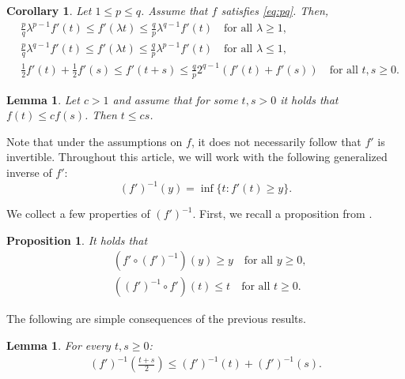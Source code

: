 \documentclass[11pt]{amsart}
\theoremstyle{plain}
\newtheorem{lemma}[theorem]{Lemma}
\newtheorem{corollary}[theorem]{Corollary}
\newtheorem{proposition}[theorem]{Proposition}
\theoremstyle{definition}
\numberwithin{equation}{section}
\begin{document}
\begin{corollary}\cite[Corollary 2.4]{ChKiWe21}
Let $1 \leq p \leq q$. Assume that $f$ satisfies \eqref{eq:pq}. Then,
\begin{align}
\label{eq:derivativedoubling1}
&\frac{p}{q} \lambda^{p-1} f'(t) \leq f'(\lambda t) \leq \frac{q}{p}\lambda^{q-1} f'(t) \quad\text{for all } \lambda \geq 1, \\
\label{eq:derivativedoubling2}
&\frac{p}{q} \lambda^{q-1} f'(t) \leq f'(\lambda t) \leq \frac{q}{p}\lambda^{p-1} f'(t) \quad\text{for all } \lambda \leq 1, \\
\label{eq:der-subadd}
&\frac{1}{2}f'(t) + \frac{1}{2}f'(s) \le f'(t + s) \leq \frac{q}{p} 2^{q-1}(f'(t) + f'(s)) \quad\text{for all } t,s \geq 0.
\end{align}
\end{corollary}

\begin{lemma}\cite[Lemma 2.5]{ChKiWe21}
\label{lem:g-inv}
Let $c > 1$ and assume that for some $t,s > 0$ it holds that $f(t) \le c f(s)$. Then $t \le cs$.
\end{lemma}

Note that under the assumptions on $f$, it does not necessarily follow that $f'$ is invertible. Throughout this article, we will work with the following generalized inverse of $f'$: 
\begin{equation}\label{eq:geninverse}
(f')^{-1}(y) = \inf \lbrace t: f'(t) \geq y \rbrace.
\end{equation}

We collect a few properties of $(f')^{-1}$. First, we recall a proposition from \cite{ChKiWe21}.

\begin{proposition}\cite[Proposition 3.1]{ChKiWe21}
It holds that
\begin{align}
\label{eq:f-finv}
&(f' \circ (f')^{-1})(y) \geq y \quad \text{for all } y \geq 0,\\
\label{eq:finv-f}
&((f')^{-1} \circ f')(t) \leq t \quad \text{for all } t \geq 0.
\end{align}
\end{proposition}

The following are simple consequences of the previous results.

\begin{lemma}
\label{lem:fprimeinvadd}
For every $t,s \ge 0$:
\begin{align*}
(f')^{-1}\left( \frac{t+s}{2} \right) \le (f')^{-1}(t) + (f')^{-1}(s).
\end{align*}
\end{lemma}
\end{document}

